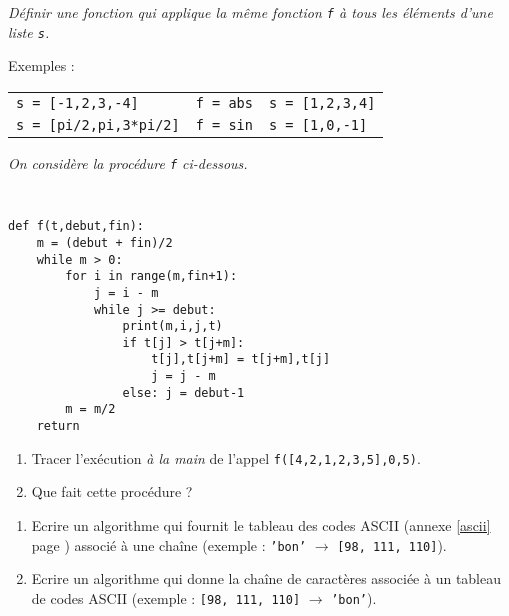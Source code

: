 \begin{td}\label{td:foreach}
\em
Définir une fonction qui applique la même fonction {\tt f} à tous les éléments d'une liste {\tt s}.

Exemples : 
\begin{tabular}[t]{l@{ , }l@{ $\rightarrow$ }l}
{\tt s = [-1,2,3,-4]}		& {\tt f = abs} & {\tt s = [1,2,3,4]}\\
{\tt s = [pi/2,pi,3*pi/2]}	& {\tt f = sin} & {\tt s = [1,0,-1]}
\end{tabular}
\end{td}


\begin{td}\label{td:trishell}
\em
On considère la procédure {\tt f} ci-dessous.

\noindent\mbox{}\hspace*{1cm}\begin{py}{7cm}\tt
\begin{verbatim}
def f(t,debut,fin):
    m = (debut + fin)/2
    while m > 0:
        for i in range(m,fin+1):
            j = i - m
            while j >= debut:
                print(m,i,j,t)
                if t[j] > t[j+m]:
                    t[j],t[j+m] = t[j+m],t[j]
                    j = j - m
                else: j = debut-1
        m = m/2
    return 
\end{verbatim}
\end{py}

\vspace*{2mm}

\begin{enumerate}
\item Tracer l'exécution {\em à la main} de l'appel {\tt f([4,2,1,2,3,5],0,5)}.
\item Que fait cette procédure ?
\end{enumerate}

\end{td}


\begin{td}\label{td:asciichaines}
\em
\begin{enumerate}
\item Ecrire un algorithme qui fournit le tableau des codes ASCII
        (annexe \ref{ascii} page \pageref{ascii}) associé
        à une chaîne (exemple : {\tt 'bon'} $\rightarrow$ {\tt [98, 111, 110]}).
\item Ecrire un algorithme qui donne la chaîne de caractères associée à un tableau de codes
        ASCII (exemple : {\tt [98, 111, 110]} $\rightarrow$ {\tt 'bon'}).
\end{enumerate}
\end{td}

